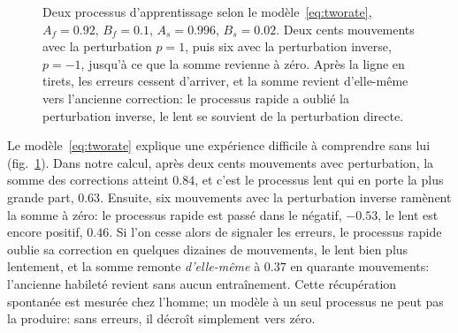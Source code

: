 \begin{figure}[t]
\centering
{}
\caption{Deux processus d'apprentissage selon le modèle~\eqref{eq:tworate}, $A_f=0.92$, $B_f=0.1$, $A_s=0.996$, $B_s=0.02$. Deux cents mouvements avec la perturbation $p=1$, puis six avec la perturbation inverse, $p=-1$, jusqu'à ce que la somme revienne à zéro. Après la ligne en tirets, les erreurs cessent d'arriver, et la somme revient d'elle-même vers l'ancienne correction: le processus rapide a oublié la perturbation inverse, le lent se souvient de la perturbation directe.}
\label{fig:tworate}
\end{figure}

Le modèle~\eqref{eq:tworate} explique une expérience difficile à comprendre sans lui (fig.~\ref{fig:tworate}). Dans notre calcul, après deux cents mouvements avec perturbation, la somme des corrections atteint $0.84$, et c'est le processus lent qui en porte la plus grande part, $0.63$. Ensuite, six mouvements avec la perturbation inverse ramènent la somme à zéro: le processus rapide est passé dans le négatif, $-0.53$, le lent est encore positif, $0.46$. Si l'on cesse alors de signaler les erreurs, le processus rapide oublie sa correction en quelques dizaines de mouvements, le lent bien plus lentement, et la somme remonte \emph{d'elle-même} à $0.37$ en quarante mouvements: l'ancienne habileté revient sans aucun entraînement. Cette récupération spontanée est mesurée chez l'homme; un modèle à un seul processus ne peut pas la produire: sans erreurs, il décroît simplement vers zéro.

